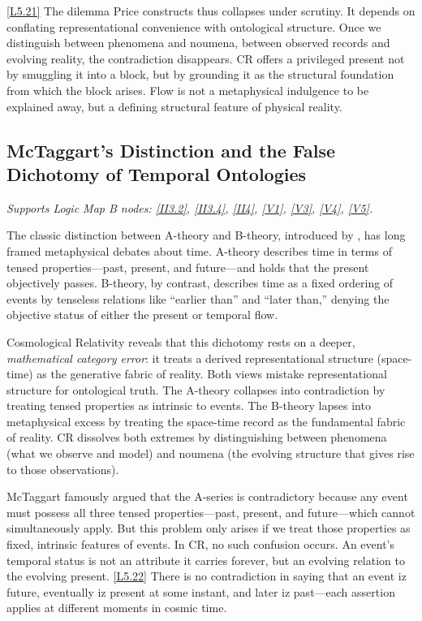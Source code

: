 \documentclass[12pt]{book}
\newcounter{logicanchor}
\newenvironment{logicanchorenv}[1]{\refstepcounter{logicanchor}\label{#1}}{}
\newcommand{\logiclink}[2]{\begin{logicanchorenv}{logic:#1}\end{logicanchorenv}\hyperref[appendix:#1]{[#1]}\xspace}
\begin{document}
\logiclink{L5.21}{} The dilemma Price constructs thus collapses under scrutiny. It depends on conflating representational convenience with ontological structure. Once we distinguish between phenomena and noumena, between observed records and evolving reality, the contradiction disappears. CR offers a privileged present not by smuggling it into a block, but by grounding it as the structural foundation from which the block arises. Flow is not a metaphysical indulgence to be explained away, but a defining structural feature of physical reality.

\subsection{McTaggart's Distinction and the False Dichotomy of Temporal Ontologies}\label{sec:5.3.6}
\noindent\textit{Supports Logic Map B nodes: \hyperref[appendix:II3.2]{[II3.2]}, \hyperref[appendix:II3.4]{[II3.4]}, \hyperref[appendix:II4]{[II4]}, \hyperref[appendix:V1]{[V1]}, \hyperref[appendix:V3]{[V3]}, \hyperref[appendix:V4]{[V4]}, \hyperref[appendix:V5]{[V5]}.}

\vspace{4pt}

The classic distinction between A-theory and B-theory, introduced by \citet{McTaggart1908}, has long framed metaphysical debates about time. A-theory describes time in terms of tensed properties---past, present, and future---and holds that the present objectively passes. B-theory, by contrast, describes time as a fixed ordering of events by tenseless relations like ``earlier than'' and ``later than,'' denying the objective status of either the present or temporal flow.

Cosmological Relativity reveals that this dichotomy rests on a deeper, \textit{mathematical category error}: it treats a derived representational structure (space-time) as the generative fabric of reality. Both views mistake representational structure for ontological truth. The A-theory collapses into contradiction by treating tensed properties as intrinsic to events. The B-theory lapses into metaphysical excess by treating the space-time record as the fundamental fabric of reality. CR dissolves both extremes by distinguishing between phenomena (what we observe and model) and noumena (the evolving structure that gives rise to those observations).

McTaggart famously argued that the A-series is contradictory because any event must possess all three tensed properties---past, present, and future---which cannot simultaneously apply. But this problem only arises if we treat those properties as fixed, intrinsic features of events. In CR, no such confusion occurs. An event's temporal status is not an attribute it carries forever, but an evolving relation to the evolving present. \logiclink{L5.22}{} There is no contradiction in saying that an event iz future, eventually iz present at some instant, and later iz past---each assertion applies at different moments in cosmic time.
\end{document}
